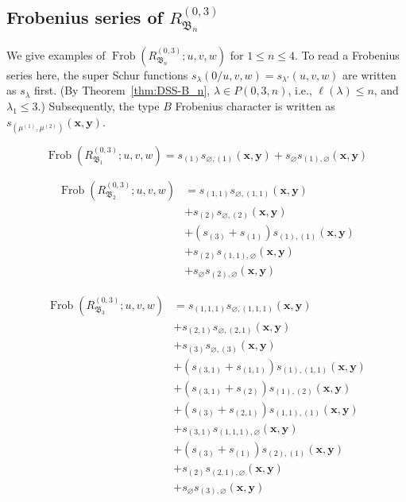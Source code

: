 \documentclass[12pt]{amsart}
\theoremstyle{plain}
\theoremstyle{definition}
\DeclareMathOperator{\Frob}{Frob}
\newcommand{\x}{\mathbf{x}}
\newcommand{\y}{\mathbf{y}}
\begin{document}
\subsection{Frobenius series of \texorpdfstring{$R_{\mathfrak{B}_n}^{(0,3)}$}{RBn(0,3)}}
We give examples of $\Frob(R_{\mathfrak{B}_n}^{(0,3)};u,v,w)$ for $1 \leq n \leq 4$. 
To read a Frobenius series here, the super Schur functions $s_\lambda(0/ u,v,w) = s_{\lambda'}(u,v,w)$ are written as $s_\lambda$ first. 
(By Theorem~\ref{thm:DSS-B_n}, $\lambda \in P(0,3,n)$, i.e., $\ell(\lambda) \leq n$, and $\lambda_1 \leq 3$.)
Subsequently, the type $B$ Frobenius character is written as $s_{(\mu^{(1)},\mu^{(2)})}(\x,\y)$.

\begin{equation}
\Frob(R_{\mathfrak{B}_1}^{(0,3)};u,v,w) = s_{(1)}s_{\varnothing,(1)}(\x,\y) + s_{\varnothing}s_{(1),\varnothing}(\x,\y)
\end{equation}

\begin{equation}
\begin{aligned}
\Frob(R_{\mathfrak{B}_2}^{(0,3)};u,v,w) &= s_{(1,1)}s_{\varnothing,(1,1)}(\x,\y)\\ 
&+ s_{(2)}s_{\varnothing,(2)}(\x,\y)\\ 
&+ (s_{(3)} + s_{(1)})s_{(1),(1)}(\x,\y)\\ 
&+ s_{(2)}s_{(1,1),\varnothing}(\x,\y)\\ 
&+ s_{\varnothing}s_{(2),\varnothing}(\x,\y)
\end{aligned}
\end{equation}

\begin{equation}
\begin{aligned}
\Frob(R_{\mathfrak{B}_3}^{(0,3)};u,v,w) &= s_{(1,1,1)}s_{\varnothing,(1,1,1)}(\x,\y)\\ 
&+ s_{(2,1)}s_{\varnothing,(2,1)}(\x,\y)\\ 
&+ s_{(3)}s_{\varnothing,(3)}(\x,\y)\\ 
&+ (s_{(3,1)} + s_{(1,1)})s_{(1),(1,1)}(\x,\y)\\ 
&+ (s_{(3,1)} + s_{(2)})s_{(1),(2)}(\x,\y)\\ 
&+ (s_{(3)} + s_{(2,1)})s_{(1,1),(1)}(\x,\y)\\ 
&+ s_{(3,1)}s_{(1,1,1),\varnothing}(\x,\y)\\ 
&+ (s_{(3)} + s_{(1)})s_{(2),(1)}(\x,\y)\\ 
&+ s_{(2)}s_{(2,1),\varnothing}(\x,\y)\\ 
&+ s_{\varnothing}s_{(3),\varnothing}(\x,\y)
\end{aligned}
\end{equation}
\end{document}
